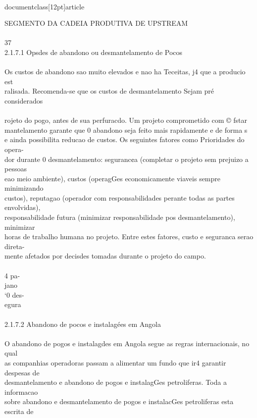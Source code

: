 \\documentclass[12pt]{article}
\begin{document}
SEGMENTO DA CADEIA PRODUTIVA DE UPSTREAM\\
\\
37\\
2.1.7.1 Opsdes de abandono ou desmantelamento de Pocos\\
\\
Os custos de abandono sao muito elevados e nao ha Teceitas, j4 que a producio est\\
ralisada. Recomenda-se que os custos de desmantelamento Sejam pré considerados\\
\\
rojeto do pogo, antes de sua perfuracdo. Um projeto comprometido com © fstar\\
mantelamento garante que 0 abandono seja feito mais rapidamente e de forma s\\
e ainda possibilita reducao de custos. Os seguintes fatores como Prioridades do opera-\\
dor durante 0 desmantelamento: seguranc¢a (completar o projeto sem prejuizo a pessoas\\
eao meio ambiente), custos (operagGes economicamente viaveis sempre minimizando\\
custos), reputagao (operador com responsabilidades perante todas as partes envolvidas),\\
responsabilidade futura (minimizar responsabilidade pos desmantelamento), minimizar\\
horas de trabalho humana no projeto. Entre estes fatores, custo e seguranca serao direta-\\
mente afetados por decisdes tomadas durante o projeto do campo.\\
\\
4 pa-\\
jano\\
‘0 des-\\
egura\\
\\
2.1.7.2 Abandono de pocos e instalagées em Angola\\
\\
O abandono de pogos e instalagdes em Angola segue as regras internacionais, no qual\\
as companhias operadoras passam a alimentar um fundo que ir4 garantir despesas de\\
desmantelamento e abandono de pogos e instalagGes petroliferas. Toda a informacao\\
sobre abandono e desmantelamento de pogos e instalacGes petroliferas esta escrita de\\
\end{document}
